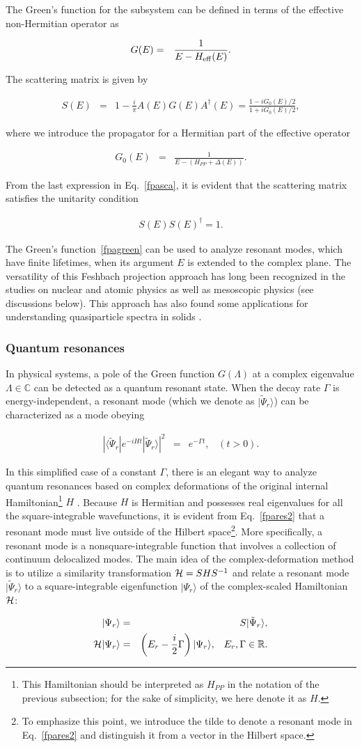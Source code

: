 \documentclass{tADP2e}
\theoremstyle{plain}
\newcommand{\eqn}[1]{
\begin{eqnarray}
	#1
\end{eqnarray}
}
\theoremstyle{plain}
\theoremstyle{definition}
\begin{document}
The  Green's function for the subsystem can be defined in terms of the effective non-Hermitian operator as \cite{DS95}
\eqn{\label{fpagreen}
G(E) & = & \frac{1}{E-H_{{\rm eff}}(E)}.
}
The scattering matrix is given by
\eqn{
S(E) & = & 1-\frac{i}{\pi}A(E)G(E)A^\dagger(E)=\frac{1-iG_{0}(E)/2}{1+iG_{0}(E)/2},\label{fpasca}
}
where we introduce the propagator for a Hermitian part of the effective operator
\eqn{
G_{0}(E) & = & \frac{1}{E-(H_{PP}+\Delta(E))}.
}
From the last expression in Eq.~\eqref{fpasca}, it is evident that the scattering matrix satisfies the unitarity condition
\eqn{
S(E)S(E)^\dagger=1.
}
The Green's function~\eqref{fpagreen} can be used to analyze resonant modes, which have finite lifetimes, when its argument $E$ is extended to the complex plane. The versatility of this Feshbach projection approach has long been recognized in the studies on   nuclear and atomic physics as well as mesoscopic physics (see discussions below). This approach has also found some applications for understanding quasiparticle spectra in solids  \cite{DS95,IR09,GV11,VK17,SH182,YoT18,ZHG19,MY20}.


\subsubsection{Quantum resonances}\label{Sec:QR}
In physical systems, a pole of the Green function $G(\Lambda)$ at a complex eigenvalue $\Lambda\in{\mathbb C}$ can be detected as a quantum resonant state. When the decay rate $\Gamma$ is energy-independent,  a resonant mode (which we denote as $|\tilde{\Psi}_{r}\rangle$) can be characterized as a mode obeying \cite{SB78}
\eqn{
|\langle\tilde{\Psi}_{r}|e^{-iHt}|\tilde{\Psi}_{r}\rangle|^{2} & = & e^{-\Gamma t},\;\;\;(t>0).\label{fpares2}
}
In this simplified case of a constant $\Gamma$, there is an elegant way to analyze quantum resonances based on complex deformations of the original internal Hamiltonian\footnote{This Hamiltonian should be interpreted as $H_{PP}$ in the notation of the previous subsection; for the sake of simplicity, we here denote it as $H$.} $H$ \cite{NM98}. Because $H$ is Hermitian and possesses real eigenvalues for all the square-integrable wavefunctions, it is evident from Eq.~\eqref{fpares2} that a resonant mode must live outside of the Hilbert space\footnote{To emphasize this point, we introduce the tilde to denote a resonant mode in Eq.~\eqref{fpares2} and distinguish it from a vector in the Hilbert space.}. More specifically, a resonant mode is a nonsquare-integrable function that involves a collection of continuum delocalized modes. 
The main idea of the complex-deformation method is to utilize a similarity transformation ${\cal H}=SHS^{-1}$ and relate a resonant mode $|\tilde{\Psi}_r\rangle$ to a square-integrable eigenfunction $|\Psi_{ r}\rangle$ of the complex-scaled Hamiltonian $\cal H$:
\eqn{
|\Psi_r\rangle&=&S|\tilde{\Psi}_r\rangle,\\
{\cal H}|\Psi_{r}\rangle & = & \left(E_{r}-\frac{i}{2}\Gamma\right)|\Psi_{r}\rangle,\;\;\;E_r,\Gamma\in{\mathbb R}.
}
\end{document}
